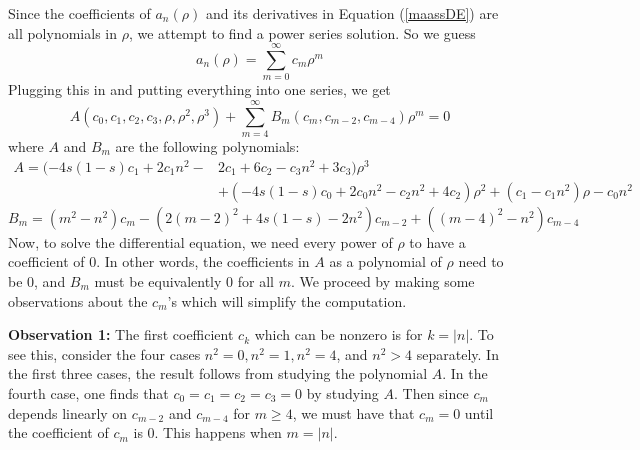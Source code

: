 \documentclass[]{article}
\begin{document}
Since the coefficients of $a_n(\rho)$ and its derivatives in Equation (\ref{maassDE}) are all polynomials in $\rho$, we attempt to find a power series solution.
So we guess
$$
a_n(\rho) = \sum_{m=0}^{\infty}c_m\rho^m
$$
Plugging this in and putting everything into one series, we get
$$
A(c_0, c_1, c_2, c_3, \rho, \rho^2, \rho^3) + \sum_{m=4}^{\infty}B_m(c_m, c_{m-2}, c_{m-4})\rho^m = 0
$$
where $A$ and $B_m$ are the following polynomials:
$$
\begin{aligned}
A = (-4s(1-s)c_1 + 2c_1n^2 - &2c_1 + 6c_2 - c_3n^2 + 3c_3)\rho^3 \\ &+ (-4s(1-s)c_0 + 2c_0n^2 - c_2n^2 + 4c_2)\rho^2 + (c_1 - c_1n^2 )\rho - c_0n^2
\end{aligned}
$$$$
B_m = (m^2 - n^2)c_m - (2(m - 2)^2 + 4s(1-s) - 2n^2)c_{m-2} + ((m - 4)^2 - n^2)c_{m-4}
$$
Now, to solve the differential equation, we need every power of $\rho$ to have a coefficient of $0$.
In other words, the coefficients in $A$ as a polynomial of $\rho$ need to be $0$, and $B_m$ must be equivalently $0$ for all $m$.
We proceed by making some observations about the $c_m$'s which will simplify the computation.

\textbf{Observation 1:} The first coefficient $c_k$ which can be nonzero is for $k = |n|$.
To see this, consider the four cases $n^2 = 0, n^2 = 1, n^2 = 4$, and $n^2 > 4$ separately.
In the first three cases, the result follows from studying the polynomial $A$.
In the fourth case, one finds that $c_0 = c_1 = c_2 = c_3 = 0$ by studying $A$.
Then since $c_m$ depends linearly on $c_{m-2}$ and $c_{m-4}$ for $m \geq 4$, we must have that $c_m = 0$ until the coefficient of $c_m$ is $0$.
This happens when $m = |n|$.
\end{document}
